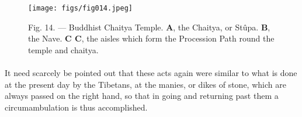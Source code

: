 \documentclass[a4paper, 11pt, oneside, polutonikogreek, english]{article}
\begin{document}
\begin{figure}[H]
\centering
\texttt{[image: figs/fig014.jpeg]}
\caption[Fig. 14. --- Buddhist Chaitya Temple.]{Fig. 14. --- Buddhist Chaitya Temple. \textbf{A}, the Chaitya, or Stûpa. \textbf{B}, the Nave. \textbf{C C}, the aisles which form the Procession Path round the temple and chaitya.}
\end{figure}
\paragraph{}
It need scarcely be pointed out that these acts again were similar to what is done at the present day by the Tibetans, at the manies, or dikes of stone, which are always passed on the right hand, so that in going and returning past them a circumambulation is thus accomplished.
\end{document}
